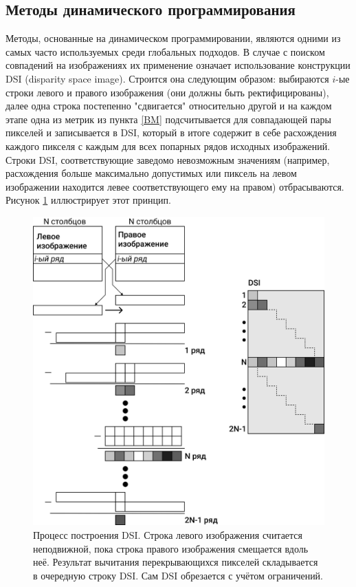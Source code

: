 \subsection{Методы динамического программирования}
Методы, основанные на динамическом программировании, являются одними из самых часто используемых среди глобальных подходов.  
В случае с поиском совпадений на изображениях их применение означает использование конструкции DSI (disparity space image). Строится она следующим образом: 
выбираются $i$-ые строки левого и правого изображения (они должны быть ректифицированы), далее одна строка постепенно "сдвигается" относительно другой и
на каждом этапе одна из метрик из пункта \ref{BM} подсчитывается для совпадающей пары пикселей и записывается в DSI, который в итоге содержит в себе расхождения каждого пикселя 
с каждым для всех попарных рядов исходных изображений. Строки DSI, соответствующие заведомо невозможным значениям (например, расхождения больше максимально допустимых или пиксель на 
левом изображении находится левее соответствующего ему на правом) отбрасываются. Рисунок \ref{pic:DSI} \cite{DSI} иллюстрирует этот принцип. 
\begin{figure}[H]
	\begin{center}
		\includegraphics[scale=0.04]{pics/DSI_rus.png}
		\caption{Процесс построения DSI. Строка левого изображения считается неподвижной, пока строка правого изображения смещается вдоль неё. Результат вычитания 
				 перекрывающихся пикселей складывается в очередную строку DSI. Сам DSI обрезается с учётом ограничений.	} 
		\label{pic:DSI} %
	\end{center}
\end{figure}
